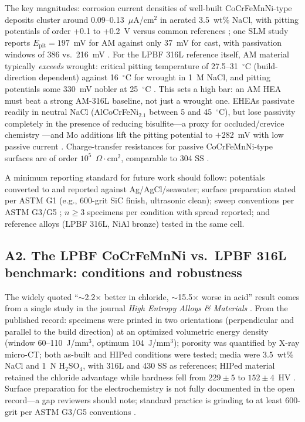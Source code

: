 The key magnitudes: corrosion current densities of well-built CoCrFeMnNi-type deposits cluster around 0.09--0.13~$\mu$A/cm$^{2}$ in aerated 3.5~wt\% NaCl, with pitting potentials of order +0.1 to +0.2~V versus common references \cite{met2019slmcorr}; one SLM study reports $E_{\mathrm{pit}}=197$~mV for AM against only 37~mV for cast, with passivation windows of 386 vs.\ 216~mV \cite{met2019slmcorr}. For the LPBF 316L reference itself, AM material typically \emph{exceeds} wrought: critical pitting temperature of 27.5--31~$^{\circ}$C (build-direction dependent) against 16~$^{\circ}$C for wrought in 1~M NaCl, and pitting potentials some 330~mV nobler at 25~$^{\circ}$C \cite{slm316l_cpt}. This sets a high bar: an AM HEA must beat a strong AM-316L baseline, not just a wrought one. EHEAs passivate readily in neutral NaCl (AlCoCrFeNi$_{2.1}$ between 5 and 45~$^{\circ}$C), but lose passivity completely in the presence of reducing bisulfite---a proxy for occluded/crevice chemistry \cite{jac_ehea2023}---and Mo additions lift the pitting potential to $+282$~mV with low passive current \cite{mo_ehea_2026}. Charge-transfer resistances for passive CoCrFeMnNi-type surfaces are of order $10^{5}$~$\Omega\cdot$cm$^{2}$, comparable to 304 SS \cite{fs_coating2026}.

A minimum reporting standard for future work should follow: potentials converted to and reported against Ag/AgCl/seawater; surface preparation stated per ASTM G1 \cite{astm_g1} (e.g., 600-grit SiC finish, ultrasonic clean); sweep conventions per ASTM G3/G5 \cite{astm_g3,astm_g5}; $n\geq3$ specimens per condition with spread reported; and reference alloys (LPBF 316L, NiAl bronze) tested in the same cell.

\subsection{A2. The LPBF CoCrFeMnNi vs.\ LPBF 316L benchmark: conditions and robustness}
\label{sec:a2}

The widely quoted ``$\sim$2.2$\times$ better in chloride, $\sim$15.5$\times$ worse in acid'' result comes from a single study in the journal \emph{High Entropy Alloys \& Materials} \cite{lpbf_cantor_2024}. From the published record: specimens were printed in two orientations (perpendicular and parallel to the build direction) at an optimized volumetric energy density (window 60--110~J/mm$^{3}$, optimum 104~J/mm$^{3}$); porosity was quantified by X-ray micro-CT; both as-built and HIPed conditions were tested; media were 3.5~wt\% NaCl and 1~N H$_{2}$SO$_{4}$, with 316L and 430 SS as references; HIPed material retained the chloride advantage while hardness fell from $229\pm5$ to $152\pm4$~HV \cite{lpbf_cantor_2024}. Surface preparation for the electrochemistry is not fully documented in the open record---a gap reviewers should note; standard practice is grinding to at least 600-grit per ASTM G3/G5 conventions \cite{astm_g3,astm_g5}.

